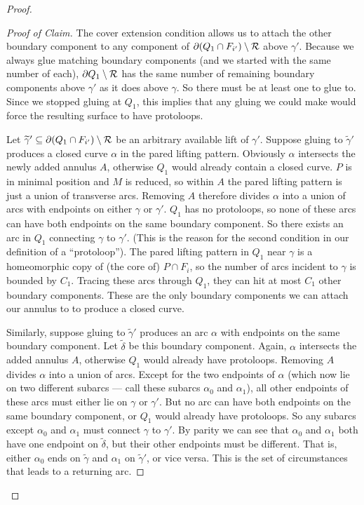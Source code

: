 \begin{proof}
\begin{proof}[Proof of Claim]
The cover extension condition allows us to attach the other boundary component
to any component of $\partial(Q_1 \cap F_{i'}) \setminus \mathcal{R}$ above $\gamma'$.
Because we always glue matching boundary components (and we started with the
same number of each), $\partial Q_1 \setminus \mathcal{R}$ has the same number of remaining
boundary components above $\gamma'$ as it does above $\gamma$. So there must be
at least one to glue to.  Since we stopped gluing at $Q_1$, this implies that
any gluing we could make would force the resulting surface to have protoloops.

Let $\widetilde{\gamma}' \subseteq \partial(Q_1 \cap F_{i'}) \setminus \mathcal{R}$ be an
arbitrary available lift of $\gamma'$.  Suppose gluing to $\widetilde{\gamma}'$
produces a closed curve $\alpha$ in the pared lifting pattern. Obviously
$\alpha$ intersects the newly added annulus $A$, otherwise $Q_1$ would already
contain a closed curve. $P$ is in minimal position and $M$ is reduced, so
within $A$ the pared lifting pattern is just a union of transverse arcs.
Removing $A$ therefore divides $\alpha$ into a union of arcs with endpoints on
either $\gamma$ or $\gamma'$.  $Q_1$ has no protoloops, so none of these arcs
can have both endpoints on the same boundary component. So there exists an arc
in $Q_1$ connecting $\gamma$ to $\gamma'$.  (This is the reason for the second
condition in our definition of a ``protoloop'').  The pared lifting pattern in
$Q_1$ near $\gamma$ is a homeomorphic copy of (the core of) $P \cap F_i$, so
the number of arcs incident to $\gamma$ is bounded by $C_1$.  Tracing these
arcs through $Q_1$, they can hit at most $C_1$ other boundary components.
These are the only boundary components we can attach our annulus to to produce
a closed curve.

Similarly, suppose gluing to $\widetilde{\gamma}'$ produces an arc $\alpha$
with endpoints on the same boundary component. Let $\widetilde{\delta}$ be this
boundary component. Again, $\alpha$ intersects the added annulus $A$, otherwise
$Q_1$ would already have protoloops. Removing $A$ divides $\alpha$ into a union
of arcs.  Except for the two endpoints of $\alpha$ (which now lie on two
different subarcs --- call these subarcs $\alpha_0$ and $\alpha_1$), all other
endpoints of these arcs must either lie on $\gamma$ or $\gamma'$.  But no arc
can have both endpoints on the same boundary component, or $Q_1$ would already
have protoloops.  So any subarcs except $\alpha_0$ and $\alpha_1$ must connect
$\gamma$ to $\gamma'$.  By parity we can see that $\alpha_0$ and $\alpha_1$
both have one endpoint on $\widetilde{\delta}$, but their other endpoints must
be different.  That is, either $\alpha_0$ ends on $\widetilde{\gamma}$ and
$\alpha_1$ on $\widetilde{\gamma}'$, or vice versa.  This is the set of
circumstances that leads to a returning arc.


\end{proof}
\end{proof}
